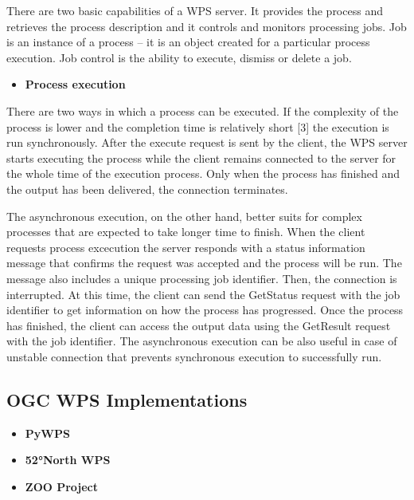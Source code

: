 There are two basic capabilities of a WPS server. It provides the process and retrieves the process description and it controls and monitors processing jobs. Job is an instance of a process – it is an object created for a particular process execution. Job control is the ability to execute, dismiss or delete a job.

\begin{itemize}
\item \textbf{Process execution}
\end{itemize}

There are two ways in which a process can be executed. If the complexity of the process is lower and the completion time is relatively short [3] the execution is run synchronously. After the execute request is sent by the client, the WPS server starts executing the process while the client remains connected to the server for the whole time of the execution process. Only when the process has finished and the output has been delivered, the connection terminates.\par
The asynchronous execution, on the other hand, better suits for complex processes that are expected to take longer time to finish. When the client requests process excecution the server responds with a status information message that confirms the request was accepted and the process will be run. The message also includes a unique processing job identifier. Then, the connection is interrupted. At this time, the client can send the GetStatus request with the job identifier to get information on how the process has progressed. Once the process has finished, the client can access the output data using the GetResult request with the job identifier. The asynchronous execution can be also useful in case of unstable connection that prevents synchronous execution to successfully run.


\subsection{OGC WPS Implementations}





\begin{itemize}
\item \textbf{PyWPS}
	
  
	
\item \textbf{52°North WPS}
	
  

\item \textbf{ZOO Project}
	
\end{itemize}
  


